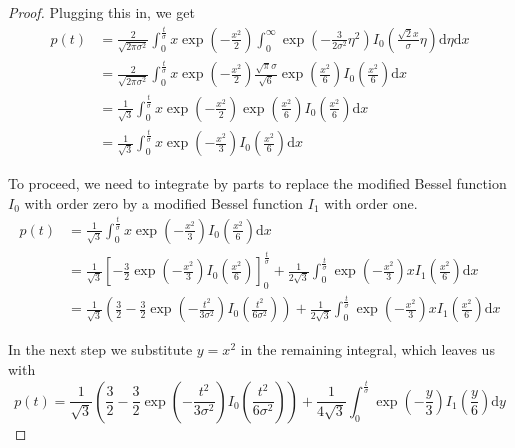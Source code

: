 \documentclass[a4paper,12pt]{article}
\theoremstyle{plain}
\theoremstyle{definition}
\theoremstyle{remark}
\begin{document}
\begin{proof}
	Plugging this in, we get
	\begin{align*}
		p(t) &= \frac{2}{\sqrt{2 \pi \sigma^2}} \int_0^\frac{t}{\sigma} x \exp \left( - \frac{x^2}{2} \right) \int_0^\infty \exp \left( - \frac{3}{2 \sigma^2} \eta^2 \right) I_0 \left( \frac{\sqrt{2} x}{\sigma} \eta \right) \mathrm{d}\eta \mathrm{d}x \\
		&= \frac{2}{\sqrt{2 \pi \sigma^2}} \int_0^\frac{t}{\sigma} x \exp \left( - \frac{x^2}{2} \right) \frac{\sqrt{\pi} \sigma}{\sqrt{6}} \exp \left( \frac{x^2}{6} \right) I_0 \left( \frac{x^2}{6} \right) \mathrm{d}x \\
		&= \frac{1}{\sqrt{3}} \int_0^\frac{t}{\sigma} x \exp \left( - \frac{x^2}{2} \right) \exp \left( \frac{x^2}{6} \right) I_0 \left( \frac{x^2}{6} \right) \mathrm{d}x \\
		&= \frac{1}{\sqrt{3}} \int_0^\frac{t}{\sigma} x \exp \left( - \frac{x^2}{3} \right) I_0 \left( \frac{x^2}{6} \right) \mathrm{d}x
	\end{align*}
	
	To proceed, we need to integrate by parts to replace the modified Bessel function $I_0$ with order zero by a modified Bessel function $I_1$ with order one.
	\begin{align*}
		p(t) &= \frac{1}{\sqrt{3}} \int_0^\frac{t}{\sigma} x \exp \left( - \frac{x^2}{3} \right) I_0 \left( \frac{x^2}{6} \right) \mathrm{d}x \\
		&= \frac{1}{\sqrt{3}} \left[ - \frac{3}{2} \exp \left( - \frac{x^2}{3} \right) I_0 \left( \frac{x^2}{6} \right) \right]_0^\frac{t}{\sigma} + \frac{1}{2 \sqrt{3}} \int_0^\frac{t}{\sigma} \exp \left( - \frac{x^2}{3} \right) x I_1 \left( \frac{x^2}{6} \right) \mathrm{d}x \\
		&= \frac{1}{\sqrt{3}} \left( \frac{3}{2} - \frac{3}{2} \exp \left( - \frac{t^2}{3 \sigma^2} \right) I_0 \left( \frac{t^2}{6 \sigma^2} \right) \right) + \frac{1}{2 \sqrt{3}} \int_0^\frac{t}{\sigma} \exp \left( - \frac{x^2}{3} \right) x I_1 \left( \frac{x^2}{6} \right) \mathrm{d}x
	\end{align*}
	
	In the next step we substitute $y = x^2$ in the remaining integral, which leaves us with
	\begin{equation*}
		p(t) = \frac{1}{\sqrt{3}} \left( \frac{3}{2} - \frac{3}{2} \exp \left( - \frac{t^2}{3 \sigma^2} \right) I_0 \left( \frac{t^2}{6 \sigma^2} \right) \right) + \frac{1}{4 \sqrt{3}} \int_0^\frac{t}{\sigma} \exp \left( - \frac{y}{3} \right) I_1 \left( \frac{y}{6} \right) \mathrm{d}y
	\end{equation*}
	

\end{proof}
\end{document}
